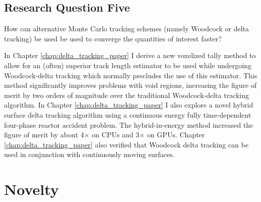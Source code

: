 \subsection{Research Question Five}

\begin{displayquote}
How can alternative Monte Carlo tracking schemes (namely Woodcock or delta tracking) be used be used to converge the quantities of interest faster?
\end{displayquote}
In Chapter \ref{chap:delta_tracking_paper} I derive a new voxelized tally method to allow for an (often) superior track length estimator to be used while undergoing Woodcock-delta tracking which normally precludes the use of this estimator.
This method significantly improves problems with void regions, increasing the figure of merit by two orders of magnitude over the traditional Woodcock-delta tracking algorithm.
In Chapter \ref{chap:delta_tracking_paper} I also explore a novel hybrid surface delta tracking algorithm using a continuous energy fully time-dependent four-phase reactor accident problem.
The hybrid-in-energy method increased the figure of merit by about 4$\times$ on CPUs and 3$\times$ on GPUs.
Chapter \ref{chap:delta_tracking_paper} also verified that Woodcock delta tracking can be used in conjunction with continuously moving surfaces.

\section{Novelty}

